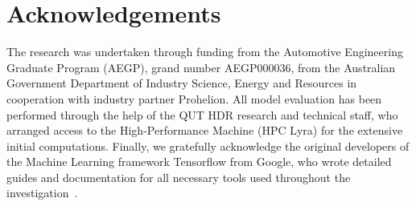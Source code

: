 \section{Acknowledgements}\label{sec:acknowledgements}
The research was undertaken through funding from the Automotive Engineering Graduate Program (AEGP), grand number AEGP000036, from the Australian Government Department of Industry Science, Energy and Resources in cooperation with industry partner Prohelion.
% 
All model evaluation has been performed through the help of the QUT HDR research and technical staff, who arranged access to the High-Performance Machine (HPC Lyra) for the extensive initial computations.
Finally, we gratefully acknowledge the original developers of the Machine Learning framework Tensorflow from Google, who wrote detailed guides and documentation for all necessary tools used throughout the investigation~\cite{tensorflow2015-whitepaper}.
